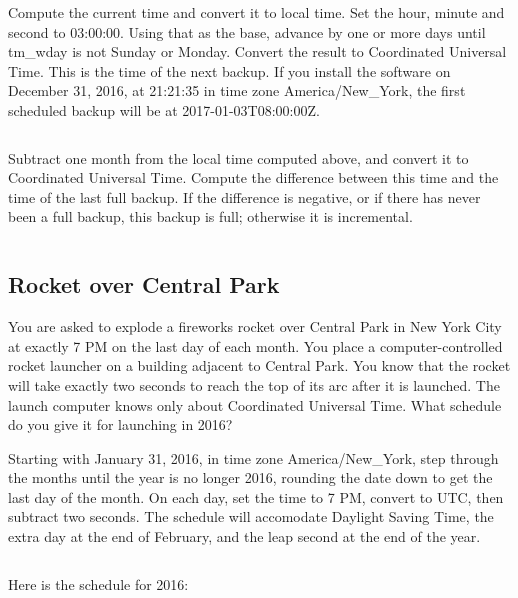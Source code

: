 \documentclass[letterpaper,twoside]{article}
\begin{document}
Compute the current time and convert it to local time.
Set the hour, minute and second to 03:00:00.
Using that as the base, advance by one or more days
until tm\_wday is not Sunday or Monday.  Convert the result
to Coordinated Universal Time.  This is the time of the
next backup.  If you install the software on December 31, 2016,
at 21:21:35 in time zone America/New\_York, the first
scheduled backup will be at 2017-01-03T08:00:00Z.
\inputminted[firstline=44,lastline=76]{c}{examples/example_02.c}

Subtract one month from the local time computed above, and
convert it to Coordinated Universal Time.  Compute the
difference between this time and the time of the last
full backup.  If the difference is negative, or if there
has never been a full backup, this backup is full;
otherwise it is incremental.
\inputminted[firstline=78,lastline=94]{c}{examples/example_02.c}

\subsection{Rocket over Central Park}
You are asked to explode a fireworks rocket over Central
Park in New York City at exactly 7 PM on the last day of each month.
You place a computer-controlled
rocket launcher on a building adjacent to Central Park.  You know that
the rocket will take exactly two seconds to reach the top of its
arc after it is launched.  The launch computer knows only about Coordinated
Universal Time.  What schedule do you give it for launching in 2016?

Starting with January 31, 2016, in time zone America/New\_York,
step through the months until the year is no longer 2016, rounding
the date down to get the last day of the month.
On each day, set the time to 7 PM, convert to UTC, then subtract
two seconds.  The schedule will accomodate Daylight Saving Time,
the extra day at the end of February,
and the leap second at the end of the year.
\inputminted[firstline=45,lastline=81]{c}{examples/example_03.c}

Here is the schedule for 2016:
\end{document}
